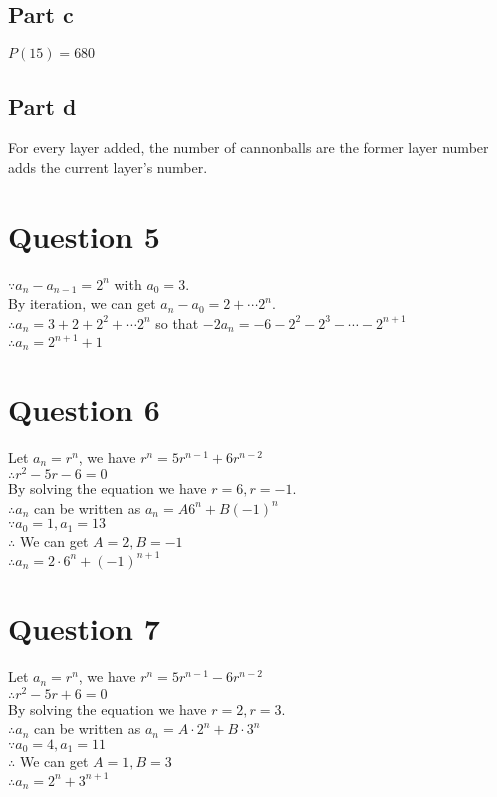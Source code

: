 \documentclass[11pt, oneside]{article}   	%
\begin{document}
	\subsection*{Part c}
	$P(15)=680$
	\subsection*{Part d}
	For every layer added, the number of cannonballs are the former layer number adds the current layer's number.

\section*{Question 5}

	$\because a_{n}-a_{n-1}=2^{n}$ with $a_{0}=3$.\\
	By iteration, we can get $a_{n}-a_{0}=2+\cdots 2^{n}$.\\
	$\therefore a_{n}=3+2+2^{2}+\cdots 2^{n}$ so that $-2a_{n}=-6-2^{2}-2^{3}-\cdots -2^{n+1}$\\
	$\therefore a_{n}=2^{n+1}+1$

\section*{Question 6}

	Let $a_{n}=r^{n}$, we have $r^{n}=5r^{n-1}+6r^{n-2}$\\
	$\therefore r^{2}-5r-6=0$\\
	By solving the equation we have $r=6, r=-1$.\\
	$\therefore a_{n}$ can be written as $a_{n}=A6^{n}+B(-1)^{n}$\\
	$\because a_{0}=1,a_{1}=13$\\
	$\therefore$ We can get $A=2,B=-1$\\
	$\therefore a_{n}=2\cdot 6^{n}+(-1)^{n+1}$

\section*{Question 7}

	Let $a_{n}=r^{n}$, we have $r^{n}=5r^{n-1}-6r^{n-2}$\\
	$\therefore r^{2}-5r+6=0$\\
	By solving the equation we have $r=2, r=3$.\\
	$\therefore a_{n}$ can be written as $a_{n}=A\cdot 2^{n}+B\cdot3^{n}$\\
	$\because a_{0}=4,a_{1}=11$\\
	$\therefore$ We can get $A=1,B=3$\\
	$\therefore a_{n}=2^{n}+3^{n+1}$
\end{document}
